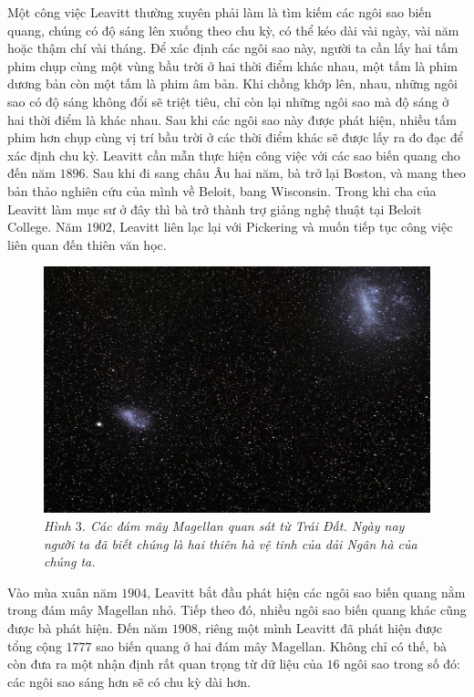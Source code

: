 \begin{multicols}{2}
	\vskip 0.1cm
	Một công việc Leavitt thường xuyên phải làm là tìm kiếm các ngôi sao biến quang, chúng có độ sáng lên xuống theo chu kỳ, có thể kéo dài vài ngày, vài năm hoặc thậm chí vài tháng. Để xác định các ngôi sao này, người ta cần lấy hai tấm phim chụp cùng một vùng bầu trời ở hai thời điểm khác nhau, một tấm là phim dương bản còn một tấm là phim âm bản. Khi chồng khớp lên, nhau, những ngôi sao có độ sáng không đổi sẽ triệt tiêu, chỉ còn lại những ngôi sao mà độ sáng ở hai thời điểm là khác nhau. Sau khi các ngôi sao này được phát hiện, nhiều tấm phim hơn chụp cùng vị trí bầu trời ở các thời điểm khác sẽ được lấy ra đo đạc để xác định chu kỳ.
	\vskip 0.1cm
	Leavitt cần mẫn thực hiện công việc với các sao biến quang cho đến năm $1896$. Sau khi đi sang châu Âu hai năm, bà trở lại Boston, và mang theo bản thảo nghiên cứu của mình về Beloit, bang Wisconsin. Trong khi cha của Leavitt làm mục sư ở đây thì bà trở thành trợ giảng nghệ thuật tại Beloit College. Năm $1902$, Leavitt liên lạc lại với Pickering và muốn tiếp tục công việc liên quan đến thiên văn học.
	\begin{figure}[H]
		\vspace*{-5pt}
		\centering
		\captionsetup{labelformat= empty, justification=centering}
		\includegraphics[width= 1\linewidth]{3}
		\caption{\small\textit{\color{timhieukhoahoc}Hình $3$. Các đám mây Magellan quan sát từ Trái Đất. Ngày nay người ta đã biết chúng là hai thiên hà vệ tinh của dải Ngân hà của chúng ta.}}
		\vspace*{-10pt}
	\end{figure}
	Vào mùa xuân năm $1904$, Leavitt bắt đầu phát hiện các ngôi sao biến quang nằm trong đám mây Magellan nhỏ. Tiếp theo đó, nhiều ngôi sao biến quang khác cũng được bà phát hiện. Đến năm $1908$, riêng một mình Leavitt đã phát hiện được tổng cộng $1777$ sao biến quang ở hai đám mây Magellan. Không chỉ có thế, bà còn đưa ra một nhận định rất quan trọng từ dữ liệu của $16$ ngôi sao trong số đó: các ngôi sao sáng hơn sẽ có chu kỳ dài hơn.

\end{multicols}
